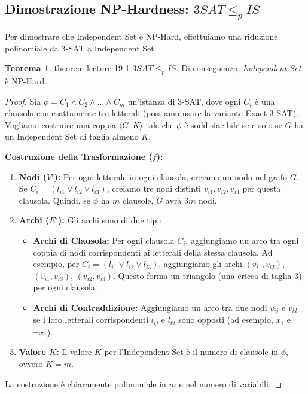 \documentclass[a4paper]{article}
\theoremstyle{definition} %
\newtheorem{theorem}{Teorema}
[section]
\theoremstyle{definition} %
\begin{document}
\subsection{Dimostrazione NP-Hardness: $3SAT \le_p IS$}

Per dimostrare che Independent Set è NP-Hard, effettuiamo una riduzione polinomiale da 3-SAT a Independent Set.

\begin{theorem}{}{{ theorem-lecture-19-1 }}
$3SAT \le_p IS$. Di conseguenza, \emph{Independent Set} è NP-Hard.
\end{theorem}

\begin{proof}
Sia $\phi = C_1 \land C_2 \land \dots \land C_m$ un'istanza di 3-SAT, dove ogni $C_i$ è una clausola con esattamente tre letterali (possiamo usare la variante Exact 3-SAT). Vogliamo costruire una coppia $\langle G, K \rangle$ tale che $\phi$ è soddisfacibile se e solo se $G$ ha un Independent Set di taglia almeno $K$.

\textbf{Costruzione della Trasformazione ($f$):}
\begin{enumerate}
    \item \textbf{Nodi ($V'$):} Per ogni letterale in ogni clausola, creiamo un nodo nel grafo $G$. Se $C_i = (l_{i1} \lor l_{i2} \lor l_{i3})$, creiamo tre nodi distinti $v_{i1}, v_{i2}, v_{i3}$ per questa clausola.
    Quindi, se $\phi$ ha $m$ clausole, $G$ avrà $3m$ nodi.
    \item \textbf{Archi ($E'$):} Gli archi sono di due tipi:
    \begin{itemize}
        \item \textbf{Archi di Clausola:} Per ogni clausola $C_i$, aggiungiamo un arco tra ogni coppia di nodi corrispondenti ai letterali della stessa clausola. Ad esempio, per $C_i = (l_{i1} \lor l_{i2} \lor l_{i3})$, aggiungiamo gli archi $(v_{i1}, v_{i2})$, $(v_{i1}, v_{i3})$, $(v_{i2}, v_{i3})$. Questo forma un triangolo (una cricca di taglia 3) per ogni clausola.
        \item \textbf{Archi di Contraddizione:} Aggiungiamo un arco tra due nodi $v_{ij}$ e $v_{kl}$ se i loro letterali corrispondenti $l_{ij}$ e $l_{kl}$ sono opposti (ad esempio, $x_1$ e $\neg x_1$).
    \end{itemize}
    \item \textbf{Valore $K$:} Il valore $K$ per l'Independent Set è il numero di clausole in $\phi$, ovvero $K=m$.
\end{enumerate}
La costruzione è chiaramente polinomiale in $m$ e nel numero di variabili.


\end{proof}
\end{document}
